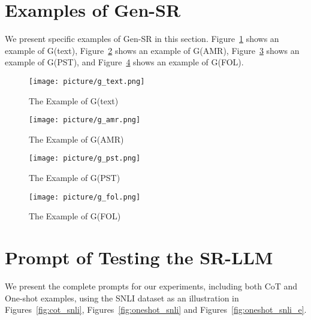 \section{Examples of Gen-SR}
\label{app:prompt_gensr}
We present specific examples of Gen-SR in this section. Figure~\ref{fig:g_text} shows an example of G(text), Figure~\ref{fig:g_amr} shows an example of G(AMR), Figure~\ref{fig:g_pst} shows an example of G(PST), and Figure~\ref{fig:g_fol} shows an example of G(FOL).

\begin{figure}[!ht]
\centering
\vspace{0.1in}
\texttt{[image: picture/g\_text.png]}
\vspace{0.1in}
\caption{The Example of G(text)}
\label{fig:g_text}
\vspace{0.1in}
\end{figure}

\begin{figure}[!ht]
\centering
\vspace{0.1in}
\texttt{[image: picture/g\_amr.png]}
\vspace{0.1in}
\caption{The Example of G(AMR)}
\label{fig:g_amr}
\vspace{0.1in}
\end{figure}


\begin{figure}[!ht]
\centering
\vspace{0.1in}
\texttt{[image: picture/g\_pst.png]}
\vspace{0.1in}
\caption{The Example of G(PST)}
\label{fig:g_pst}
\vspace{0.1in}
\end{figure}

\begin{figure}[!ht]
\centering
\vspace{0.1in}
\texttt{[image: picture/g\_fol.png]}
\vspace{0.1in}
\caption{The Example of G(FOL)}
\label{fig:g_fol}
\vspace{0.1in}
\end{figure}

\section{Prompt of Testing the SR-LLM}
\label{app:prompt}
We present the complete prompts for our experiments, including both CoT and One-shot examples, using the SNLI dataset as an illustration in Figures~\ref{fig:cot_snli}, Figures~\ref{fig:oneshot_snli} and Figures~\ref{fig:oneshot_snli_e}.


